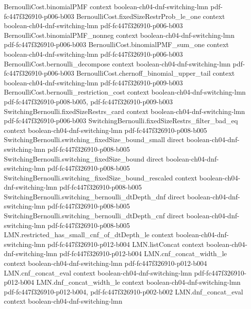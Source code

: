 \begin{theorem}
\proofstep
  {BernoulliCost.binomialPMF}
  {context}
  {boolean-ch04-dnf-switching-lmn}
  {pdf-fc447f326910-p006-b003}
\proofstep
  {BernoulliCost.fixedSizeRestrProb_le_one}
  {context}
  {boolean-ch04-dnf-switching-lmn}
  {pdf-fc447f326910-p006-b003}
\proofstep
  {BernoulliCost.binomialPMF_nonneg}
  {context}
  {boolean-ch04-dnf-switching-lmn}
  {pdf-fc447f326910-p006-b003}
\proofstep
  {BernoulliCost.binomialPMF_sum_one}
  {context}
  {boolean-ch04-dnf-switching-lmn}
  {pdf-fc447f326910-p006-b003}
\proofstep
  {BernoulliCost.bernoulli_decompose}
  {context}
  {boolean-ch04-dnf-switching-lmn}
  {pdf-fc447f326910-p006-b003}
\proofstep
  {BernoulliCost.chernoff_binomial_upper_tail}
  {context}
  {boolean-ch04-dnf-switching-lmn}
  {pdf-fc447f326910-p009-b003}
\proofstep
  {BernoulliCost.bernoulli_restriction_cost}
  {context}
  {boolean-ch04-dnf-switching-lmn}
  {pdf-fc447f326910-p008-b005,
    pdf-fc447f326910-p009-b003}
\proofstep
  {SwitchingBernoulli.fixedSizeRestrs_card}
  {context}
  {boolean-ch04-dnf-switching-lmn}
  {pdf-fc447f326910-p006-b003}
\proofstep
  {SwitchingBernoulli.fixedSizeRestrs_filter_bad_eq}
  {context}
  {boolean-ch04-dnf-switching-lmn}
  {pdf-fc447f326910-p008-b005}
\proofstep
  {SwitchingBernoulli.switching_fixedSize_bound_small}
  {direct}
  {boolean-ch04-dnf-switching-lmn}
  {pdf-fc447f326910-p008-b005}
\proofstep
  {SwitchingBernoulli.switching_fixedSize_bound}
  {direct}
  {boolean-ch04-dnf-switching-lmn}
  {pdf-fc447f326910-p008-b005}
\proofstep
  {SwitchingBernoulli.switching_fixedSize_bound_rescaled}
  {context}
  {boolean-ch04-dnf-switching-lmn}
  {pdf-fc447f326910-p008-b005}
\proofstep
  {SwitchingBernoulli.switching_bernoulli_dtDepth_dnf}
  {direct}
  {boolean-ch04-dnf-switching-lmn}
  {pdf-fc447f326910-p008-b005}
\proofstep
  {SwitchingBernoulli.switching_bernoulli_dtDepth_cnf}
  {direct}
  {boolean-ch04-dnf-switching-lmn}
  {pdf-fc447f326910-p008-b005}
\proofstep
  {LMN.restricted_has_small_cnf_of_dtDepth_le}
  {context}
  {boolean-ch04-dnf-switching-lmn}
  {pdf-fc447f326910-p012-b004}
\proofstep
  {LMN.listConcat}
  {context}
  {boolean-ch04-dnf-switching-lmn}
  {pdf-fc447f326910-p012-b004}
\proofstep
  {LMN.cnf_concat_width_le}
  {context}
  {boolean-ch04-dnf-switching-lmn}
  {pdf-fc447f326910-p012-b004}
\proofstep
  {LMN.cnf_concat_eval}
  {context}
  {boolean-ch04-dnf-switching-lmn}
  {pdf-fc447f326910-p012-b004}
\proofstep
  {LMN.dnf_concat_width_le}
  {context}
  {boolean-ch04-dnf-switching-lmn}
  {pdf-fc447f326910-p012-b004,
    pdf-fc447f326910-p002-b002}
\proofstep
  {LMN.dnf_concat_eval}
  {context}
  {boolean-ch04-dnf-switching-lmn}

\end{theorem}
